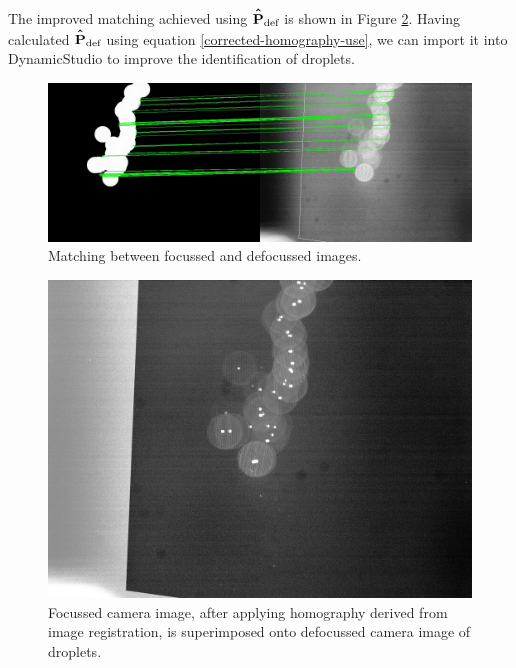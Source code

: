 \documentclass[11.5pt]{book}
\newcommand*{\Phat}{\hat{\vphantom{\scalebox{1.2}{P}} P}}
\begin{document}
The improved matching achieved using $\mathbf{\Phat}_\text{def}$ is shown in
Figure \ref{fig:drop-calibration-corrected}. Having calculated $\mathbf{\Phat}_\text{def}$ using
equation \eqref{corrected-homography-use}, we can import it into DynamicStudio
to improve the identification of droplets.

\begin{figure}[t]
    \centering
    \includegraphics[width=\textwidth]{img/asift-matching.jpg}
    \caption{Matching between focussed and defocussed images.}
    \label{fig:asift-matching}
\end{figure}

\begin{figure}[t]
    \centering
    \includegraphics[width=0.45\textheight]{img/drop-calibration-corrected.jpg}
    \caption{Focussed camera image, after applying homography
        derived from image registration, is superimposed onto defocussed
    camera image of droplets.}
    \label{fig:drop-calibration-corrected}
\end{figure}

\end{document}
